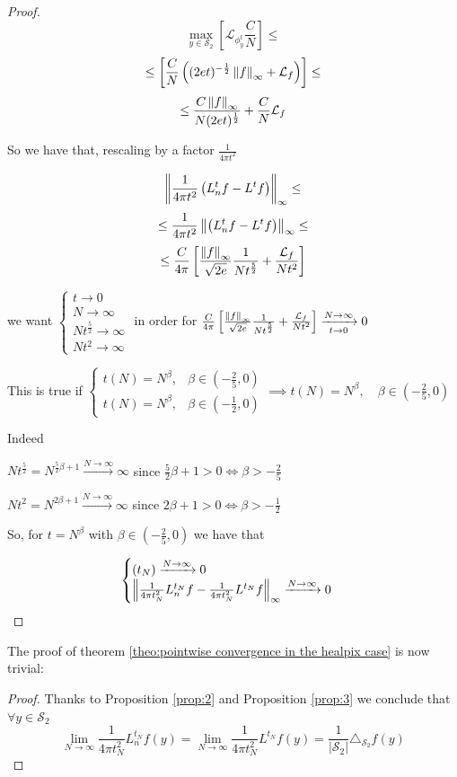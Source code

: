 \begin{proof}
	$$ \max _{y\in \mathcal S_2} \left[  \mathcal L_{\phi^t_y} \frac{C}{N} \right]\leq$$
	$$ \leq \left[   \frac{C}{N} \left( (2et)^{-\frac{1}{2}} \left\lVert f\right\rVert_\infty + \mathcal L_f \right)\right]\leq$$
	$$  \leq \frac{C\left\lVert f\right\rVert_\infty}{N(2et)^\frac{1}{2}} +   \frac{C}{N}\mathcal L_f$$
	
	So we have that, rescaling by a factor $\frac{1}{4\pi t^2}$
	
	$$\left\lVert\frac{1}{4\pi t^2}\left(L_n^tf-L^tf\right)\right\rVert_\infty\leq$$
	$$\leq \frac{1}{4\pi t^2}\left\lVert\left(L_n^tf-L^tf\right)\right\rVert_\infty \leq$$
	$$ \leq \frac{C}{4\pi}\left[\frac{\left\lVert f\right\rVert_\infty}{\sqrt{2e}}\frac{1}{Nt^\frac{5}{2}} + \frac{\mathcal L_f}{Nt^2}\right]$$
	
	we want $\begin{cases}
	t \rightarrow 0\\
	N \rightarrow \infty\\
	Nt^\frac{5}{2} \rightarrow \infty\\
	Nt^2 \rightarrow \infty
	\end{cases}$ in order for $ \frac{C}{4\pi}\left[\frac{\left\lVert f\right\rVert_\infty}{\sqrt{2e}}\frac{1}{Nt^\frac{5}{2}} + \frac{\mathcal L_f}{Nt^2}\right] \xrightarrow[t\to 0 ]{N\to\infty}0$
	
	This is true if $\begin{cases}
	t(N) = N^\beta, &\beta\in(-\frac{2}{5}, 0) \\
	t(N) = N^\beta, &\beta\in(-\frac{1}{2}, 0)
	\end{cases} \implies t(N) = N^\beta, \quad \beta\in(-\frac{2}{5}, 0)$
	
	Indeed 
	
	$Nt^\frac{5}{2}=N^{\frac{5}{2}\beta+1}\xrightarrow{N \to \infty} \infty$ since $\frac{5}{2}\beta+1>0 \iff \beta>-\frac{2}{5}$
	
	$Nt^2=N^{2\beta+1}\xrightarrow {N \to \infty} \infty$ since $2\beta+1>0 \iff \beta>-\frac{1}{2}$
	
	So, for $t=N^\beta$ with $\beta\in(-\frac{2}{5}, 0)$ we have that 
	
	$$\begin{cases}
	(t_N)\xrightarrow{N\to\infty}0\\
	\left\lVert\frac{1}{4\pi t_N^2}L_n^{t_N}f-\frac{1}{4\pi t_N^2}L^{t_N}f\right\rVert_\infty  \xrightarrow{N\to\infty}0
	\end{cases}$$
	
\end{proof}

The proof of theorem \ref{theo:pointwise convergence in the healpix case} is now trivial:
\begin{proof}
	Thanks to Proposition \ref{prop:2} and Proposition \ref{prop:3}	we conclude that $\forall y\in\mathcal S_2 $
	$$\lim_{N\to\infty}\frac{1}{4\pi t_N^2} L_n^{t_N}f(y) =  \lim_{N\to\infty}\frac{1}{4\pi t_N^2} L^{t_N}f(y) = \frac{1}{|\mathcal S_2|}\triangle_{\mathcal S_2}f(y) $$
\end{proof}

